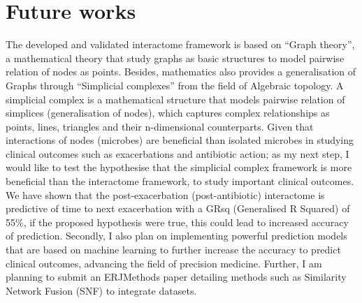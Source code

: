 \section{Future works}
The developed and validated interactome framework is based on “Graph theory”, a mathematical theory that study graphs as basic structures to model pairwise relation of nodes as points. Besides, mathematics also provides a generalisation of Graphs through “Simplicial complexes” from the field of Algebraic topology. A simplicial complex is a mathematical structure that models pairwise relation of simplices (generalisation of nodes), which captures complex relationships as points, lines, triangles and their n-dimensional counterparts. Given that interactions of nodes (microbes) are beneficial than isolated microbes in studying clinical outcomes such as exacerbations and antibiotic action; as my next step, I would like to test the hypothesise that the simplicial complex framework is more beneficial than the interactome framework, to study important clinical outcomes. We have shown that the post-exacerbation (post-antibiotic) interactome is predictive of time to next exacerbation with a GRsq (Generalised R Squared) of 55\%, if the proposed hypothesis were true, this could lead to increased accuracy of prediction. Secondly, I also plan on implementing powerful prediction models that are based on machine learning to further increase the accuracy to predict clinical outcomes, advancing the field of precision medicine. Further, I am planning to submit an ERJMethods paper detailing methods such as Similarity Network Fusion (SNF) to integrate datasets.